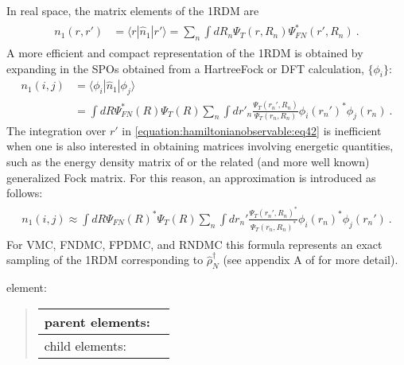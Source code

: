 \documentclass[letterpaper,10pt,english]{sphinxmanual}
\begin{document}
In real space, the matrix elements of the 1RDM are
\begin{equation}\label{equation:hamiltonianobservable:eq41}
\begin{split}\begin{aligned}
   n_1(r,r') &= \langle{r}\left|{\hat{n}_1}\right|{r'}\rangle = \sum_n\int dR_n \Psi_T(r,R_n)\Psi_{FN}^*(r',R_n)\:. \end{aligned}\end{split}
\end{equation}
A more efficient and compact representation of the 1RDM is obtained by
expanding in the SPOs obtained from a Hartree\sphinxhyphen{}Fock or DFT calculation,
\(\{\phi_i\}\):
\begin{equation}\label{equation:hamiltonianobservable:eq42}
\begin{split}n_1(i,j) &= \langle{\phi_i}\left|{\hat{n}_1}\right|{\phi_j}\rangle \nonumber \\
         &= \int dR \Psi_{FN}^*(R)\Psi_{T}(R) \sum_n\int dr'_n \frac{\Psi_T(r_n',R_n)}{\Psi_T(r_n,R_n)}\phi_i(r_n')^* \phi_j(r_n)\:.\end{split}
\end{equation}
The integration over \(r'\) in \eqref{equation:hamiltonianobservable:eq42} is inefficient when one is also interested in obtaining matrices involving energetic quantities, such as the energy density matrix of  or the related (and more well known) generalized Fock matrix.  For this reason, an approximation is introduced as follows:
\begin{equation}\label{equation:hamiltonianobservable:eq43}
\begin{split}\begin{aligned}
    n_1(i,j) \approx \int dR \Psi_{FN}(R)^*\Psi_T(R)  \sum_n \int dr_n' \frac{\Psi_T(r_n',R_n)^*}{\Psi_T(r_n,R_n)^*}\phi_i(r_n)^* \phi_j(r_n')\:. \end{aligned}\end{split}
\end{equation}
For VMC, FN\sphinxhyphen{}DMC, FP\sphinxhyphen{}DMC, and RN\sphinxhyphen{}DMC this formula represents an exact
sampling of the 1RDM corresponding to \(\hat{\rho}_N^\dagger\) (see
appendix A of  for more detail).

 element:
\begin{quote}


\begin{savenotes}\sphinxattablestart
\centering
\begin{tabulary}{\linewidth}[t]{|T|T|}
\hline

parent elements:
&
\\
\hline
child elements:
&
\\
\hline
\end{tabulary}
\par
\sphinxattableend\end{savenotes}
\end{quote}
\end{document}
